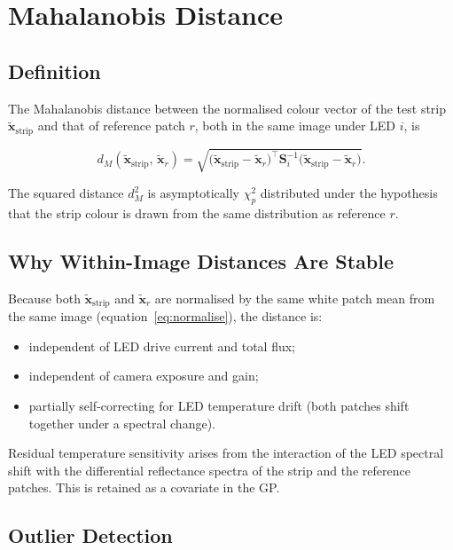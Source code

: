 \documentclass[11pt, a4paper]{article}
\newcommand{\bx}{\mathbf{x}}
\newcommand{\bS}{\mathbf{S}}
\begin{document}
\section{Mahalanobis Distance}

\subsection{Definition}

The Mahalanobis distance between the normalised colour vector of the
test strip $\tilde{\bx}_{\mathrm{strip}}$ and that of reference patch
$r$, both in the same image under LED $i$, is

\begin{equation}
  d_M\!\left(\tilde{\bx}_{\mathrm{strip}},\,\tilde{\bx}_r\right)
    = \sqrt{
        \bigl(\tilde{\bx}_{\mathrm{strip}} - \tilde{\bx}_r\bigr)^{\!\top}
        \bS_i^{-1}
        \bigl(\tilde{\bx}_{\mathrm{strip}} - \tilde{\bx}_r\bigr)
      }.
  \label{eq:mahal}
\end{equation}

The squared distance $d_M^2$ is asymptotically $\chi^2_p$ distributed
under the hypothesis that the strip colour is drawn from the same
distribution as reference $r$.

\subsection{Why Within-Image Distances Are Stable}

Because both $\tilde{\bx}_{\mathrm{strip}}$ and $\tilde{\bx}_r$ are
normalised by the same white patch mean from the same image
(equation~\eqref{eq:normalise}), the distance is:
\begin{itemize}[nosep]
  \item independent of LED drive current and total flux;
  \item independent of camera exposure and gain;
  \item partially self-correcting for LED temperature drift (both
    patches shift together under a spectral change).
\end{itemize}
Residual temperature sensitivity arises from the interaction of the
LED spectral shift with the differential reflectance spectra of the
strip and the reference patches.  This is retained as a covariate
in the GP.

\subsection{Outlier Detection}
\end{document}

